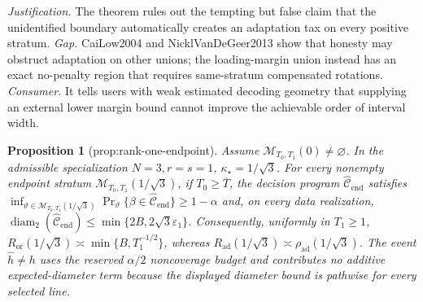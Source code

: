 \documentclass{article}
\newtheorem{proposition}{Proposition}
\begin{document}
\par\smallskip\noindent \textit{Justification.} The theorem rules out the tempting but false claim that the unidentified boundary automatically creates an adaptation tax on every positive stratum. \textit{Gap.} CaiLow2004 and NicklVanDeGeer2013 show that honesty may obstruct adaptation on other unions; the loading-margin union instead has an exact no-penalty region that requires same-stratum compensated rotations. \textit{Consumer.} It tells users with weak estimated decoding geometry that supplying an external lower margin bound cannot improve the achievable order of interval width.

\begin{proposition}[prop:rank-one-endpoint]\label{prop:rank-one-endpoint}
Assume \(\mathcal M_{T_0,T_1}(0)\ne\varnothing\). In the admissible specialization \(N=3,r=s=1\), \(\kappa_\star=1/\sqrt3\). For every nonempty endpoint stratum \(\mathcal M_{T_0,T_1}(1/\sqrt3)\), if \(T_0\ge\overline T\), the decision program \(\widehat{\mathcal C}_{\mathrm{end}}\) satisfies \(\inf_{\vartheta\in\mathcal M_{T_0,T_1}(1/\sqrt3)}\Pr_\vartheta\{\beta\in\widehat{\mathcal C}_{\mathrm{end}}\}\ge1-\alpha\) and, on every data realization, \(\operatorname{diam}_2(\widehat{\mathcal C}_{\mathrm{end}})\le\min\{2B,2\sqrt3\varepsilon_1\}\). Consequently, uniformly in \(T_1\ge1\), \(R_{\mathrm{or}}(1/\sqrt3)\asymp\min\{B,T_1^{-1/2}\}\), whereas \(R_{\mathrm{ad}}(1/\sqrt3)\asymp\rho_{\mathrm{ad}}(1/\sqrt3)\). The event \(\widehat h\ne h\) uses the reserved \(\alpha/2\) noncoverage budget and contributes no additive expected-diameter term because the displayed diameter bound is pathwise for every selected line.
\end{proposition}
\end{document}
